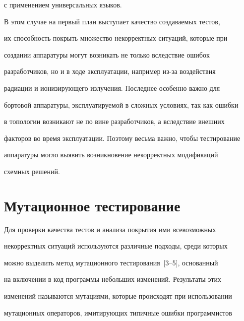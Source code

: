 с применением универсальных языков.





    В этом случае на первый план выступает качество создаваемых тестов,


их способность покрыть множество некорректных ситуаций, которые при


создании аппаратуры могут возникать не только вследствие ошибок


разработчиков, но и в ходе эксплуатации, например из-за воздействия


радиации и ионизирующего излучения. Последнее особенно важно для


бортовой аппаратуры, эксплуатируемой в сложных условиях, так как ошибки


в топологии возникают не по вине разработчиков, а вследствие внешних


факторов во время эксплуатации. Поэтому весьма важно, чтобы тестирование


аппаратуры могло выявить возникновение некорректных модификаций


схемных решений.





\vspace*{-9pt}





    \section{Мутационное тестирование}





    \vspace*{-3pt}





    Для проверки качества тестов и анализа покрытия ими всевозможных


некорректных ситуаций используются различные подходы, среди которых


можно выделить метод мутационного тестирования~[3--5],  основанный


на включении в код программы небольших изменений. Результаты этих


изменений называются мутациями, которые происходят при использовании


мутационных операторов, имитирующих типичные ошибки программистов


